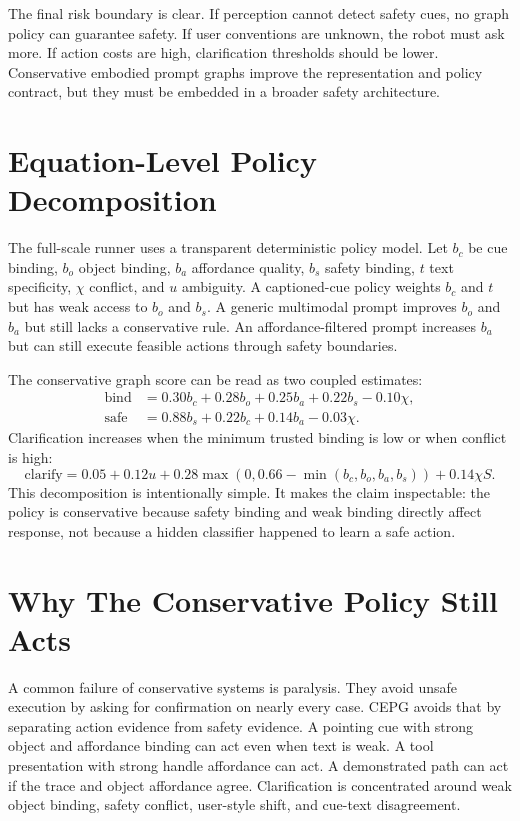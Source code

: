 \documentclass{article}
\newcommand{\method}{CEPG}
\begin{document}
The final risk boundary is clear. If perception cannot detect safety cues, no graph policy can guarantee safety. If user conventions are unknown, the robot must ask more. If action costs are high, clarification thresholds should be lower. Conservative embodied prompt graphs improve the representation and policy contract, but they must be embedded in a broader safety architecture.

\section{Equation-Level Policy Decomposition}

The full-scale runner uses a transparent deterministic policy model. Let $b_c$ be cue binding, $b_o$ object binding, $b_a$ affordance quality, $b_s$ safety binding, $t$ text specificity, $\chi$ conflict, and $u$ ambiguity. A captioned-cue policy weights $b_c$ and $t$ but has weak access to $b_o$ and $b_s$. A generic multimodal prompt improves $b_o$ and $b_a$ but still lacks a conservative rule. An affordance-filtered prompt increases $b_a$ but can still execute feasible actions through safety boundaries.

The conservative graph score can be read as two coupled estimates:
\[
\begin{aligned}
\mathrm{bind} &= 0.30b_c + 0.28b_o + 0.25b_a + 0.22b_s - 0.10\chi,\\
\mathrm{safe} &= 0.88b_s + 0.22b_c + 0.14b_a - 0.03\chi.
\end{aligned}
\]
Clarification increases when the minimum trusted binding is low or when conflict is high:
\[
\mathrm{clarify} = 0.05 + 0.12u + 0.28\max(0, 0.66-\min(b_c,b_o,b_a,b_s)) + 0.14\chi S.
\]
This decomposition is intentionally simple. It makes the claim inspectable: the policy is conservative because safety binding and weak binding directly affect response, not because a hidden classifier happened to learn a safe action.

\section{Why The Conservative Policy Still Acts}

A common failure of conservative systems is paralysis. They avoid unsafe execution by asking for confirmation on nearly every case. \method{} avoids that by separating action evidence from safety evidence. A pointing cue with strong object and affordance binding can act even when text is weak. A tool presentation with strong handle affordance can act. A demonstrated path can act if the trace and object affordance agree. Clarification is concentrated around weak object binding, safety conflict, user-style shift, and cue-text disagreement.
\end{document}
